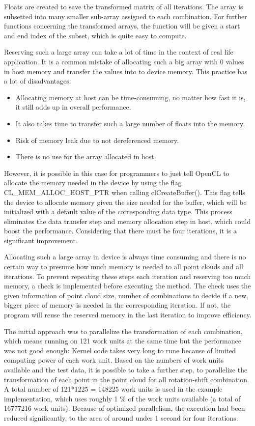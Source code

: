 Floats are created to save the transformed matrix of all iterations. The array is subsetted into many smaller sub-array assigned to each combination. For further functions concerning the transformed arrays, the function will be given a start and end index of the subset, which is quite easy to compute.

Reserving such a large array can take a lot of time in the context of real life application. It is a common mistake of allocating such a big array with 0 values in host memory and transfer the values into to device memory. This practice has a lot of disadvantages:
\begin{itemize}
\item Allocating memory at host can be time-consuming, no matter how fast it is, it still adds up in overall performance.
\item It also takes time to transfer such a large number of floats into the memory.
\item Risk of memory leak due to not dereferenced memory.
\item There is no use for the array allocated in host.
\end{itemize}
However, it is possible in this case for programmers to just tell OpenCL to allocate the memory needed in the device by using the flag CL\_MEM\_ALLOC\_HOST\_PTR when calling clCreateBuffer(). This flag tells the device to allocate memory given the size needed for the buffer, which will be initialized with a default value of the corresponding data type. This process eliminates the data transfer step and memory allocation step in host, which could boost the performance. Considering that there must be four iterations, it is a significant improvement.

Allocating such a large array in device is always time consuming and there is no certain way to presume how much memory is needed to all point clouds and all iterations. To prevent repeating these steps each iteration and reserving too much memory, a check is implemented before executing the method. The check uses the given information of point cloud size, number of combinations to decide if a new, bigger piece of memory is needed in the corresponding iteration. If not, the program will reuse the reserved memory in the last iteration to improve efficiency. 

The initial approach was to parallelize the transformation of each combination, which means running on 121 work units at the same time but the performance was not good enough: Kernel code takes very long to rune because of limited computing power of each work unit. Based on the numbers of work units available and the test data, it is possible to take a further step, to parallelize the transformation of each point in the point cloud for all rotation-shift combination. A total number of  121*1225 = 148225 work units is used in the example implementation, which uses roughly 1 \% of the work units available (a total of 16777216 work units). Because of optimized parallelism, the execution had been reduced significantly, to the area of around under 1 second for four iterations. 

